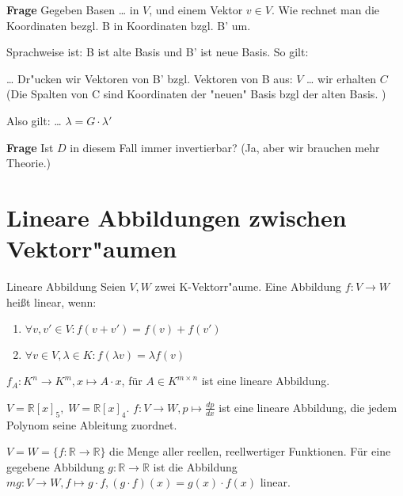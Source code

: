 \documentclass[oneside,fontsize=11pt,paper=a4,BCOR=0mm,DIV=12,automark,headsepline]{scrbook}
\theoremstyle{remark}
\theoremstyle{definition}
\theoremstyle{definition}
\theoremstyle{remark}
\begin{document}
\textbf{Frage} Gegeben Basen \ldots{} in \(V\), und einem Vektor \(v\in V\). Wie rechnet man die
Koordinaten bezgl. B in Koordinaten bzgl. B' um.

Sprachweise ist: B ist alte Basis und B' ist neue Basis.
So gilt:
\begin{relation}
\ldots{} Dr"ucken wir Vektoren von B' bzgl. Vektoren von B aus: \(V\) \ldots{}
wir erhalten \(C\) 
(Die Spalten von C sind Koordinaten der "neuen" Basis bzgl der alten Basis. )

Also gilt: \ldots{}
\(\lambda = G\cdot \lambda'\)
\end{relation}

\textbf{Frage} Ist \(D\) in diesem Fall immer invertierbar? (Ja, aber wir brauchen mehr Theorie.)

\chapter{Lineare Abbildungen zwischen Vektorr"aumen}
\label{sec:orgb4c03c4}
\begin{definition}{Lineare Abbildung}{}
Seien \(V, W\) zwei K-Vektorr"aume. Eine Abbildung \(f: V\rightarrow W\) heißt linear, wenn:

\begin{enumerate}
	\item \(\forall v,v' \in V: f(v+v')=f(v)+f(v')\)
	\item \(\forall v\in V, \lambda \in K: f(\lambda v)=\lambda f(v)\)
\end{enumerate}

\end{definition}

\begin{exa} \label{}
$f_{A}: K^n\rightarrow K^m, x\mapsto A\cdot x$, für $A \in K^{m\times n}$ ist eine lineare Abbildung.
\end{exa}

\begin{exa} \label{}
\(V=\mathbb{R}[x]_5,\;W=\mathbb{R}[x]_4\). $f: V\rightarrow W, p \mapsto \frac{dp}{dx}$ ist eine lineare Abbildung, die jedem Polynom seine Ableitung zuordnet.
\end{exa}

\begin{exa} \label{}
$V=W=\{f:\mathbb{R}\rightarrow\mathbb{R}\}$ die Menge aller reellen, reellwertiger Funktionen. Für eine gegebene Abbildung $g:\mathbb{R}\rightarrow\mathbb{R}$ ist die Abbildung $mg: V\rightarrow W, f\mapsto g\cdot f, (g\cdot f)(x)=g(x)\cdot f(x)$ linear.
\end{exa}
\end{document}
